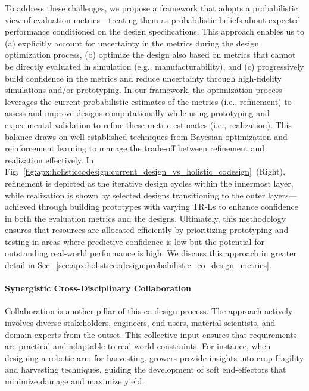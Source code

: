 To address these challenges, we propose a framework that adopts a probabilistic view of evaluation metrics—treating them as probabilistic beliefs about expected performance conditioned on the design specifications. This approach enables us to (a) explicitly account for uncertainty in the metrics during the design optimization process, (b) optimize the design also based on metrics that cannot be directly evaluated in simulation (e.g., manufacturability), and (c) progressively build confidence in the metrics and reduce uncertainty through high-fidelity simulations and/or prototyping. 
In our framework, the optimization process leverages the current probabilistic estimates of the metrics (i.e., refinement) to assess and improve designs computationally while using prototyping and experimental validation to refine these metric estimates (i.e., realization). This balance draws on well-established techniques from Bayesian optimization and reinforcement learning to manage the trade-off between refinement and realization effectively.
In Fig.~\ref{fig:apx:holisticcodesign:current_design_vs_holistic_codesign}~(Right), refinement is depicted as the iterative design cycles within the innermost layer, while realization is shown by selected designs transitioning to the outer layers—achieved through building prototypes with varying TR-Ls to enhance confidence in both the evaluation metrics and the designs.
Ultimately, this methodology ensures that resources are allocated efficiently by prioritizing prototyping and testing in areas where predictive confidence is low but the potential for outstanding real-world performance is high. We discuss this approach in greater detail in Sec.~\ref{sec:apx:holisticcodesign:probabilistic_co_design_metrics}.


\paragraph{Synergistic Cross-Disciplinary Collaboration}
Collaboration is another pillar of this co-design process. The approach actively involves diverse stakeholders, engineers, end-users, material scientists, and domain experts from the outset. This collective input ensures that requirements are practical and adaptable to real-world constraints. For instance, when designing a robotic arm for harvesting, growers provide insights into crop fragility and harvesting techniques, guiding the development of soft end-effectors that minimize damage and maximize yield.

